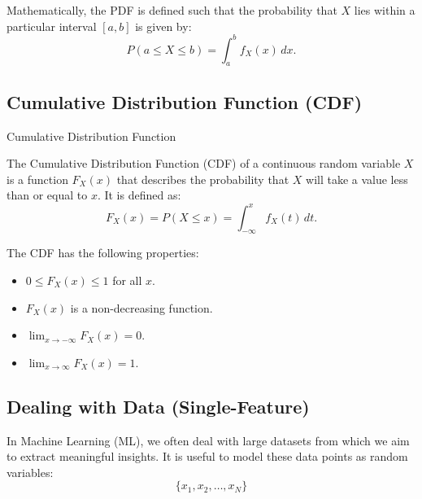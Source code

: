 Mathematically, the PDF is defined such that the probability that \(X\) lies within a particular interval \([a, b]\) is given by:
\[
P(a \leq X \leq b) = \int_{a}^{b} f_X(x) \, dx.
\]


\subsection{Cumulative Distribution Function (CDF)}
\begin{marginfigure}[50pt]
    \centering
    \caption{Cumulative Distribution Function}
\end{marginfigure}

The Cumulative Distribution Function (CDF) of a continuous random variable \(X\) is a function \(F_X(x)\) that describes the probability that \(X\) will take a value less than or equal to \(x\). It is defined as:
\[
F_X(x) = P(X \leq x) = \int_{-\infty}^{x} f_X(t) \, dt.
\]

The CDF has the following properties:
\begin{itemize}
    \item \(0 \leq F_X(x) \leq 1\) for all \(x\).
    \item \(F_X(x)\) is a non-decreasing function.
    \item \(\lim_{x \to -\infty} F_X(x) = 0\).
    \item \(\lim_{x \to \infty} F_X(x) = 1\).
\end{itemize}


\subsection{Dealing with Data (Single-Feature)}

In Machine Learning (ML), we often deal with large datasets from which we aim to extract meaningful insights. It is useful to model these data points as random variables:
\[
\{x_1, x_2, \ldots, x_N\}
\]


